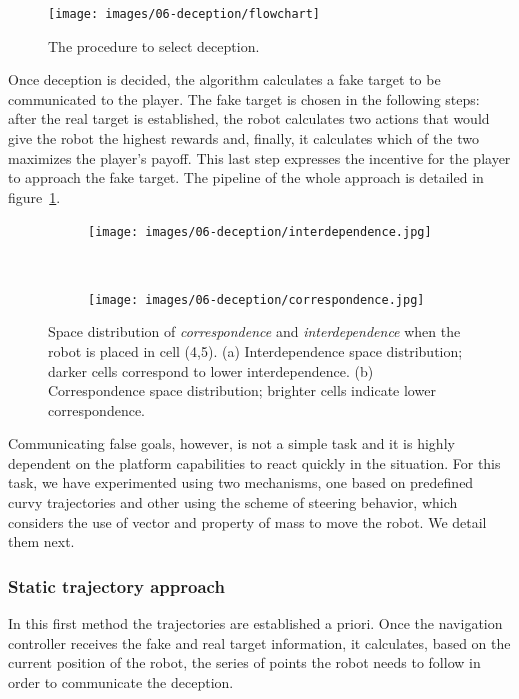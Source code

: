 \begin{figure}[h]
    \centering
    \texttt{[image: images/06-deception/flowchart]}
    \caption{The procedure to select deception.}
    \label{fig:flowchart}
\end{figure}

Once deception is decided, the algorithm calculates a fake target to be communicated to the player. The fake target is chosen in the following steps: after the real target is established, the robot calculates two actions that would give the robot the highest rewards and, finally, it calculates which of the two maximizes the player's payoff. This last step expresses the incentive for the player to approach the fake target. The pipeline of the whole approach is detailed in figure~\ref{fig:flowchart}.

\begin{figure}[H]
    \centering
    \begin{subfigure}[t]{0.49\columnwidth}
        \centering
        \texttt{[image: images/06-deception/interdependence.jpg]}
        \caption{}
        \label{fig:interdipendence}
    \end{subfigure}
    ~
    \begin{subfigure}[t]{0.49\columnwidth}
        \centering
        \texttt{[image: images/06-deception/correspondence.jpg]}
        \caption{}
        \label{fig:correspondence}
    \end{subfigure}
    \caption{Space distribution of \textit{correspondence} and \textit{interdependence} when the robot is placed in cell (4,5). (a) Interdependence space distribution; darker cells correspond to lower interdependence. (b) Correspondence space distribution; brighter cells indicate lower correspondence.}
    \label{fig::interdependece}
\end{figure}

Communicating false goals, however, is not a simple task and it is highly dependent on the platform capabilities to react quickly in the situation. For this task, we have experimented using two mechanisms, one based on predefined curvy trajectories and other using the scheme of steering behavior, which considers the use of vector and property of mass to move the robot. We detail them next.

\subsubsection{Static trajectory approach}
In this first method the trajectories are established a priori. Once the navigation controller receives the fake and real target information, it calculates, based on the current position of the robot, the series of points the robot needs to follow in order to communicate the deception.

